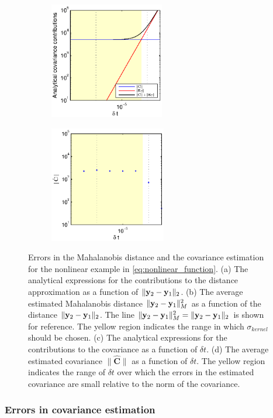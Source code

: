\begin{figure}[t]
\begin{subfigure}{0.4\textwidth}
\centering
\includegraphics[height=2in]{C_dt_analytical_nonlinear}
\caption{}
\end{subfigure}
%
\begin{subfigure}{0.4\textwidth}
\centering
\includegraphics[height=2in]{C_dt_nonlinear}
\caption{}
\end{subfigure}
%
\caption[Errors in the Mahalanobis distance and the covariance estimation for the nonlinear data]{Errors in the Mahalanobis distance and the covariance estimation for the nonlinear example in \eqref{eq:nonlinear_function}. (a) The analytical expressions for the contributions to the distance approximation as a function of $\| \mathbf{y}_2 - \mathbf{y}_1\|_2$. (b) The average estimated Mahalanobis distance $\| \mathbf{y}_2 - \mathbf{y}_1\|^2_M$ as a function of the distance $\| \mathbf{y}_2 - \mathbf{y}_1\|_2$. The line $\| \mathbf{y}_2 - \mathbf{y}_1\|^2_M = \| \mathbf{y}_2 - \mathbf{y}_1\|_2$ is shown for reference. The yellow region indicates the range in which $\sigma_{kernel}$ should be chosen. (c) The analytical expressions for the contributions to the covariance as a function of $\delta t$. (d) The average estimated covariance $\| \hat{\mathbf{C}} \|$ as a function of $\delta t$. The yellow region indicates the range of $\delta t$ over which the errors in the estimated covariance are small relative to the norm of the covariance. }
\label{fig:cov_error_nonlinear}
\end{figure}

\subsubsection{Errors in covariance estimation}

